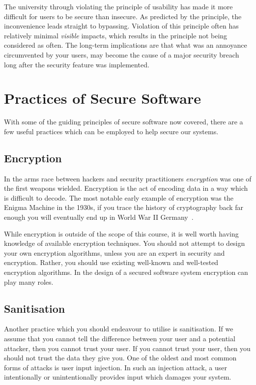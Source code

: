 The university through violating the principle of usability has made it more difficult for users to be secure than insecure.
As predicted by the principle, the inconvenience leads straight to bypassing.
Violation of this principle often has relatively minimal \emph{visible} impacts,
which results in the principle not being considered as often.
The long-term implications are that what was an annoyance circumvented by your users,
may become the cause of a major security breach long after the security feature was implemented.


\section{Practices of Secure Software}
With some of the guiding principles of secure software now covered,
there are a few useful practices which can be employed to help secure our systems.

\subsection{Encryption}
In the arms race between hackers and security practitioners \textsl{encryption} was one of the first weapons wielded.
Encryption is the act of encoding data in a way which is difficult to decode.
The most notable early example of encryption was the Enigma Machine in the 1930s,
if you trace the history of cryptography back far enough you will eventually end up in World War II Germany~\cite{web-application-security}.

While encryption is outside of the scope of this course,
it is well worth having knowledge of available encryption techniques.
You should not attempt to design your own encryption algorithms, unless you are an expert in security and encryption.
Rather, you should use existing well-known and well-tested encryption algorithms.
In the design of a secured software system encryption can play many roles.

\subsection{Sanitisation}
Another practice which you should endeavour to utilise is sanitisation.
If we assume that you cannot tell the difference between your user and a potential attacker,
then you cannot trust your user.
If you cannot trust your user, then you should not trust the data they give you.
One of the oldest and most common forms of attacks is user input injection.
In such an injection attack, a user intentionally or unintentionally provides input which damages your system.

